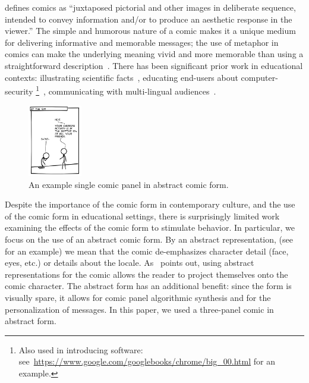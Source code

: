 \textcite{scott1993understanding} defines comics as ``juxtaposed pictorial and other images in deliberate sequence, intended to convey information and/or to produce an aesthetic response in the viewer.''  The simple and humorous nature of a comic makes it a unique medium for delivering informative and memorable messages; the use of metaphor in comics can make the underlying meaning vivid and more memorable than using a straightforward description~\parencite{McDermottPB18,scott1993understanding}. There has been significant prior work in educational contexts: illustrating scientific facts~\parencite{McDermottPB18}, educating end-users about computer-security \footnote{Also used in introducing software: see~\url{https://www.google.com/googlebooks/chrome/big_00.html} for an example.}~\parencite{Zhang-Kennedy:2017:SCI:3206217.3206282}, communicating with multi-lingual audiences~\parencite{cary2004going, miguel2005ethnic}. 

\begin{figure}
    \centering
    \includegraphics[width=0.21\textwidth]{figures/intro_new.png}
  \vspace{-10pt}
  \caption{An example single comic panel in abstract comic form.} \label{fig:intro}
  \vspace{-10pt}
\end{figure}

Despite the importance of the comic form in contemporary culture, and the use of the comic form in educational settings, there is surprisingly limited work examining the effects of the comic form to stimulate behavior. In particular, we focus on the use of an abstract comic form. By an abstract representation, (see~ for an example) we mean that the comic de-emphasizes character detail (face, eyes, etc.) or details about the locale. As~\textcite{scott1993understanding} points out, using abstract representations for the comic allows the reader to project themselves onto the comic character. The abstract form has an additional benefit: since the form is visually spare, it allows for comic panel algorithmic synthesis and for the personalization of messages. In this paper, we used a three-panel comic in abstract form.

